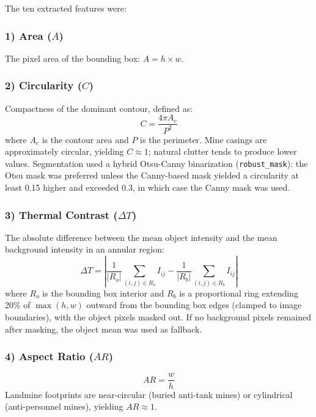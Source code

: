 \documentclass[conference]{IEEEtran}
\begin{document}
The ten extracted features were:

\subsubsection*{1) Area ($A$)}
The pixel area of the bounding box: $A = h \times w$.

\subsubsection*{2) Circularity ($C$)}
Compactness of the dominant contour, defined as:
\begin{equation}
  C = \frac{4\pi A_c}{P^2}
\end{equation}
where $A_c$ is the contour area and $P$ is the perimeter. Mine casings are approximately circular, yielding $C \approx 1$; natural clutter tends to produce lower values. Segmentation used a hybrid Otsu-Canny binarization ({\tt robust\_mask}): the Otsu mask was preferred unless the Canny-based mask yielded a circularity at least 0.15 higher and exceeded 0.3, in which case the Canny mask was used.

\subsubsection*{3) Thermal Contrast ($\Delta T$)}
The absolute difference between the mean object intensity and the mean background intensity in an annular region:
\begin{equation}
  \Delta T = \left| \frac{1}{|R_o|} \sum_{(i,j) \in R_o} I_{ij} - \frac{1}{|R_b|} \sum_{(i,j) \in R_b} I_{ij} \right|
\end{equation}
where $R_o$ is the bounding box interior and $R_b$ is a proportional ring extending 20\% of $\max(h, w)$ outward from the bounding box edges (clamped to image boundaries), with the object pixels masked out. If no background pixels remained after masking, the object mean was used as fallback.

\subsubsection*{4) Aspect Ratio ($AR$)}
\begin{equation}
  AR = \frac{w}{h}
\end{equation}
Landmine footprints are near-circular (buried anti-tank mines) or cylindrical (anti-personnel mines), yielding $AR \approx 1$.
\end{document}

